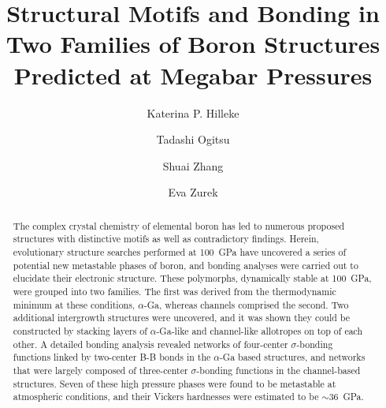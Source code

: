 \documentclass[reprint,aps,prl,twocolumn,letterpaper]{revtex4-2}
\begin{document}
\title{Structural Motifs and Bonding in Two Families of Boron Structures Predicted  at Megabar Pressures}
\author{Katerina P. Hilleke}
\author{Tadashi Ogitsu}
\author{Shuai Zhang}
\author{Eva Zurek}


\begin{abstract}
The complex crystal chemistry of elemental boron has led to numerous proposed structures with distinctive motifs as well as contradictory findings. Herein, evolutionary structure searches performed at 100~GPa have uncovered a series of potential new metastable phases of boron, and bonding analyses were carried out to elucidate their electronic structure.  These polymorphs, dynamically stable at 100~GPa, were grouped into two families. The first was derived from the thermodynamic minimum at these conditions, $\alpha$-Ga, whereas channels comprised the second.  Two additional intergrowth structures were uncovered, and it was shown they could be constructed by stacking layers of $\alpha$-Ga-like and channel-like allotropes on top of each other. A detailed bonding analysis revealed networks of four-center $\sigma$-bonding functions linked by two-center B-B bonds in the $\alpha$-Ga based structures, and networks that were largely composed of three-center $\sigma$-bonding functions in the channel-based structures. Seven of these high pressure phases were found to be metastable at atmospheric conditions, and their Vickers hardnesses were estimated to be $\sim$36~GPa.
\end{abstract}


\maketitle
\end{document}
